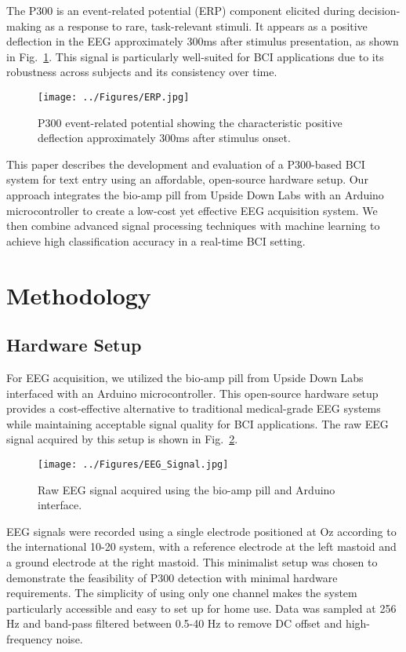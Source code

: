 \documentclass[conference]{IEEEtran}
\begin{document}
The P300 is an event-related potential (ERP) component elicited during decision-making as a response to rare, task-relevant stimuli. It appears as a positive deflection in the EEG approximately 300ms after stimulus presentation, as shown in Fig.~\ref{fig:p300_erp}. This signal is particularly well-suited for BCI applications due to its robustness across subjects and its consistency over time.

\begin{figure}[htbp]
\centerline{\texttt{[image: ../Figures/ERP.jpg]}}
\caption{P300 event-related potential showing the characteristic positive deflection approximately 300ms after stimulus onset.}
\label{fig:p300_erp}
\end{figure}

This paper describes the development and evaluation of a P300-based BCI system for text entry using an affordable, open-source hardware setup. Our approach integrates the bio-amp pill from Upside Down Labs with an Arduino microcontroller to create a low-cost yet effective EEG acquisition system. We then combine advanced signal processing techniques with machine learning to achieve high classification accuracy in a real-time BCI setting.

\section{Methodology}

\subsection{Hardware Setup}
For EEG acquisition, we utilized the bio-amp pill from Upside Down Labs interfaced with an Arduino microcontroller. This open-source hardware setup provides a cost-effective alternative to traditional medical-grade EEG systems while maintaining acceptable signal quality for BCI applications. The raw EEG signal acquired by this setup is shown in Fig.~\ref{fig:eeg_signal}.

\begin{figure}[htbp]
\centerline{\texttt{[image: ../Figures/EEG\_Signal.jpg]}}
\caption{Raw EEG signal acquired using the bio-amp pill and Arduino interface.}
\label{fig:eeg_signal}
\end{figure}

EEG signals were recorded using a single electrode positioned at Oz according to the international 10-20 system, with a reference electrode at the left mastoid and a ground electrode at the right mastoid. This minimalist setup was chosen to demonstrate the feasibility of P300 detection with minimal hardware requirements. The simplicity of using only one channel makes the system particularly accessible and easy to set up for home use. Data was sampled at 256 Hz and band-pass filtered between 0.5-40 Hz to remove DC offset and high-frequency noise.
\end{document}
